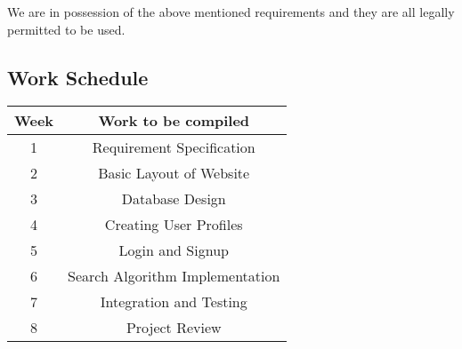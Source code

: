 \documentclass[a4paper]{article}
\begin{document}
We are in possession of the above mentioned requirements and they are all legally permitted to be used.

\subsection{Work Schedule}


\begin{center}
\begin{tabular}{ |c|c| } 
 \hline
 Week & Work to be compiled \\  \hline
 1 & Requirement Specification \\  \hline
 2 & Basic Layout of Website\\  \hline
 3 & Database Design\\  \hline
 4 & Creating User Profiles\\  \hline
 5 & Login and Signup\\  \hline
 6 & Search Algorithm Implementation\\  \hline
 7 & Integration and Testing\\  \hline
 8 & Project Review\\  \hline
 \hline
\end{tabular}
\end{center}
\end{document}
